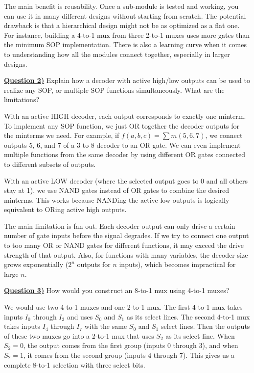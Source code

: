\documentclass[12pt, letterpaper]{article}
\begin{document}
The main benefit is reusability. Once a sub-module is tested and working, you can use it in many different designs without starting from scratch. The potential drawback is that a hierarchical design might not be as optimized as a flat one. For instance, building a 4-to-1 mux from three 2-to-1 muxes uses more gates than the minimum SOP implementation. There is also a learning curve when it comes to understanding how all the modules connect together, especially in larger designs.

\underline{\textbf{Question 2)}} Explain how a decoder with active high/low outputs can be used to realize any SOP, or multiple SOP functions simultaneously. What are the limitations?

With an active HIGH decoder, each output corresponds to exactly one minterm. To implement any SOP function, we just OR together the decoder outputs for the minterms we need. For example, if $f(a,b,c) = \sum m(5,6,7)$, we connect outputs 5, 6, and 7 of a 3-to-8 decoder to an OR gate. We can even implement multiple functions from the same decoder by using different OR gates connected to different subsets of outputs.

With an active LOW decoder (where the selected output goes to 0 and all others stay at 1), we use NAND gates instead of OR gates to combine the desired minterms. This works because NANDing the active low outputs is logically equivalent to ORing active high outputs.

The main limitation is fan-out. Each decoder output can only drive a certain number of gate inputs before the signal degrades. If we try to connect one output to too many OR or NAND gates for different functions, it may exceed the drive strength of that output. Also, for functions with many variables, the decoder size grows exponentially ($2^n$ outputs for $n$ inputs), which becomes impractical for large $n$.

\underline{\textbf{Question 3)}} How would you construct an 8-to-1 mux using 4-to-1 muxes?

We would use two 4-to-1 muxes and one 2-to-1 mux. The first 4-to-1 mux takes inputs $I_0$ through $I_3$ and uses $S_0$ and $S_1$ as its select lines. The second 4-to-1 mux takes inputs $I_4$ through $I_7$ with the same $S_0$ and $S_1$ select lines. Then the outputs of these two muxes go into a 2-to-1 mux that uses $S_2$ as its select line. When $S_2 = 0$, the output comes from the first group (inputs 0 through 3), and when $S_2 = 1$, it comes from the second group (inputs 4 through 7). This gives us a complete 8-to-1 selection with three select bits.
\end{document}
